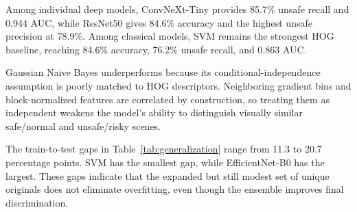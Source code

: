 \documentclass[conference]{IEEEtran}
\begin{document}
Among individual deep models, ConvNeXt-Tiny provides 85.7\% unsafe recall and 0.944 AUC, while ResNet50 gives 84.6\% accuracy and the highest unsafe precision at 78.9\%. Among classical models, SVM remains the strongest HOG baseline, reaching 84.6\% accuracy, 76.2\% unsafe recall, and 0.863 AUC.

Gaussian Naive Bayes underperforms because its conditional-independence assumption is poorly matched to HOG descriptors. Neighboring gradient bins and block-normalized features are correlated by construction, so treating them as independent weakens the model's ability to distinguish visually similar safe/normal and unsafe/risky scenes.

\begin{table}[!t]
\centering
\caption{Train, Validation, and Test Generalization}
\label{tab:generalization}
\footnotesize
\setlength{\tabcolsep}{2pt}
\end{table}

The train-to-test gaps in Table~\ref{tab:generalization} range from 11.3 to 20.7 percentage points. SVM has the smallest gap, while EfficientNet-B0 has the largest. These gaps indicate that the expanded but still modest set of unique originals does not eliminate overfitting, even though the ensemble improves final discrimination.
\end{document}
